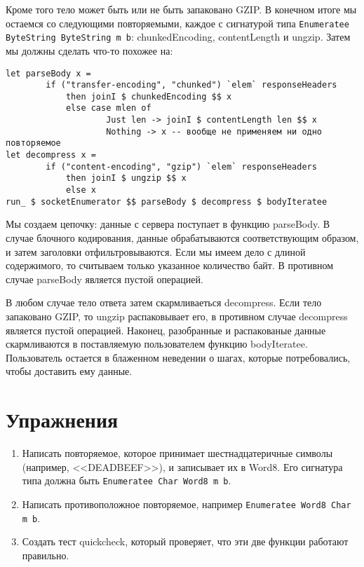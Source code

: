 Кроме того тело может быть или не быть запаковано GZIP. В конечном итоге мы остаемся со следующими повторяемыми, каждое с сигнатурой типа \lstinline'Enumeratee ByteString ByteString m b': chunkedEncoding, contentLength и ungzip. Затем мы должны сделать что-то похожее на:

\begin{lstlisting}
let parseBody x =
        if ("transfer-encoding", "chunked") `elem` responseHeaders
            then joinI $ chunkedEncoding $$ x
            else case mlen of
                    Just len -> joinI $ contentLength len $$ x
                    Nothing -> x -- вообще не применяем ни одно повторяемое
let decompress x =
        if ("content-encoding", "gzip") `elem` responseHeaders
            then joinI $ ungzip $$ x
            else x
run_ $ socketEnumerator $$ parseBody $ decompress $ bodyIteratee
\end{lstlisting}%

Мы создаем цепочку: данные с сервера поступает в функцию parseBody. В случае блочного кодирования, данные обрабатываются соответствующим образом, и затем заголовки отфильтровываются. Если мы имеем дело с длиной содержимого, то считываем только указанное количество байт. В противном случае parseBody является пустой операцией.

В любом случае тело ответа затем скармливаеться decompress. Если тело запаковано GZIP, то ungzip распаковывает его, в противном случае decompress является пустой операцией. Наконец, разобранные и распакованые данные скармливаются в поставляемую пользователем функцию bodyIteratee. Пользователь остается в блаженном неведении о шагах, которые потребовались, чтобы доставить ему данные.

\section{Упражнения}

\begin{enumerate}
\item Написать повторяемое, которое принимает шестнадцатеричные символы (например, <<DEADBEEF>>), и записывает их в Word8. Его сигнатура типа должна быть \lstinline'Enumeratee Char Word8 m b'.
\item Написать противоположное повторяемое, например \lstinline'Enumeratee Word8 Char m b'.
\item Создать тест quickcheck, который проверяет, что эти две функции работают правильно.
\end{enumerate}

